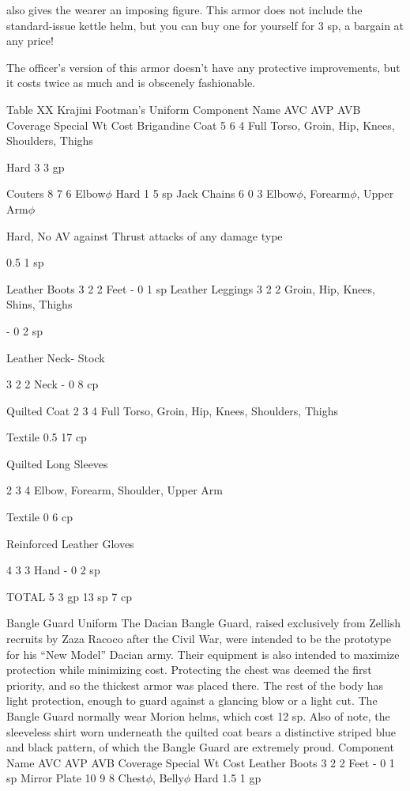 \documentclass[oneside,11pt,english]{book}
\begin{document}
also gives the wearer an imposing figure. This armor does not include the standard-issue kettle helm, but 
you can buy one for yourself for 3 sp, a bargain at any price! 

 

The officer's version of this armor doesn't have any protective improvements, but it costs twice as much 
and is obscenely fashionable. 

 

Table XX Krajini Footman’s Uniform 
Component Name AVC AVP AVB Coverage Special Wt Cost 
Brigandine Coat 5 6 4 Full Torso, Groin, Hip, Knees, 
Shoulders, Thighs 

Hard 3 3 gp 

Couters 8 7 6 Elbow$\phi$ Hard 1 5 sp 
Jack Chains 6 0 3 Elbow$\phi$, Forearm$\phi$, Upper 
Arm$\phi$ 

Hard, No AV against Thrust 
attacks of any damage type 

0.5 1 sp 

Leather Boots 3 2 2 Feet - 0 1 sp 
Leather Leggings 3 2 2 Groin, Hip, Knees, Shins, 
Thighs 

- 0 2 sp 

Leather Neck-
Stock 

3 2 2 Neck - 0 8 cp 

Quilted Coat 2 3 4 Full Torso, Groin, Hip, Knees, 
Shoulders, Thighs 

Textile 0.5 17 
cp 

Quilted Long 
Sleeves 

2 3 4 Elbow, Forearm, Shoulder, 
Upper Arm 

Textile 0 6 cp 

Reinforced Leather 
Gloves 

4 3 3 Hand - 0 2 sp 

TOTAL 5 3 gp 
13 
sp 
7 cp 

 

Bangle Guard Uniform 
The Dacian Bangle Guard, raised exclusively from Zellish recruits by Zaza Racoco after the Civil War, 
were intended to be the prototype for his “New Model” Dacian army. Their equipment is also intended to 
maximize protection while minimizing cost. Protecting the chest was deemed the first priority, and so the 
thickest armor was placed there. The rest of the body has light protection, enough to guard against a 
glancing blow or a light cut. The Bangle Guard normally wear Morion helms, which cost 12 sp. 
Also of note, the sleeveless shirt worn underneath the quilted coat bears a distinctive striped blue and 
black pattern, of which the Bangle Guard are extremely proud. 
Component Name AVC AVP AVB Coverage Special Wt Cost 
Leather Boots 3 2 2 Feet - 0 1 sp 
Mirror Plate 10 9 8 Chest$\phi$, Belly$\phi$ Hard 1.5 1 gp 
\end{document}
